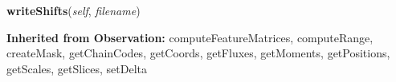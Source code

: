    \label{multireg:chipwavelets:ReferenceObs:writeShifts}
    \vspace{0.5ex}

    \begin{boxedminipage}{\textwidth}

    \raggedright \textbf{writeShifts}(\textit{self}, \textit{filename})

    \end{boxedminipage}

  \textbf{Inherited from Observation:}
    computeFeatureMatrices,
    computeRange,
    createMask,
    getChainCodes,
    getCoords,
    getFluxes,
    getMoments,
    getPositions,
    getScales,
    getSlices,
    setDelta
